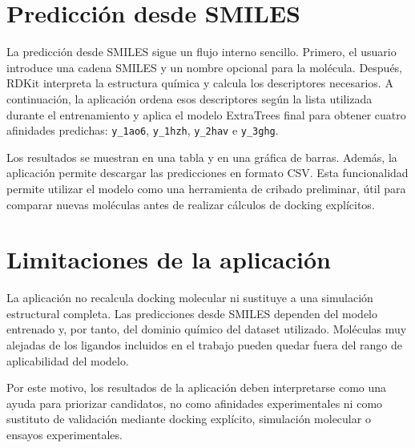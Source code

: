 \documentclass[
  spanish,
  a4paper,
  12pt,
  oneside,
  openany]{memoir}
\begin{document}
\begin{sloppypar}
\footnotesize
\noindent{}
\end{sloppypar}

\section{Predicción desde SMILES}

La predicción desde SMILES sigue un flujo interno sencillo. Primero, el
usuario introduce una cadena SMILES y un nombre opcional para la
molécula. Después, RDKit interpreta la estructura química y calcula los
descriptores necesarios. A continuación, la aplicación ordena esos
descriptores según la lista utilizada durante el entrenamiento y aplica
el modelo ExtraTrees final para obtener cuatro afinidades predichas:
\texttt{y\_1ao6}, \texttt{y\_1hzh}, \texttt{y\_2hav} e \texttt{y\_3ghg}.

Los resultados se muestran en una tabla y en una gráfica de barras.
Además, la aplicación permite descargar las predicciones en formato CSV.
Esta funcionalidad permite utilizar el modelo como una herramienta de
cribado preliminar, útil para comparar nuevas moléculas antes de
realizar cálculos de docking explícitos.

\section{Limitaciones de la aplicación}

La aplicación no recalcula docking molecular ni sustituye a una
simulación estructural completa. Las predicciones desde SMILES dependen
del modelo entrenado y, por tanto, del dominio químico del dataset
utilizado. Moléculas muy alejadas de los ligandos incluidos en el
trabajo pueden quedar fuera del rango de aplicabilidad del modelo.

Por este motivo, los resultados de la aplicación deben interpretarse
como una ayuda para priorizar candidatos, no como afinidades
experimentales ni como sustituto de validación mediante docking
explícito, simulación molecular o ensayos experimentales.


\backmatter
\end{document}
